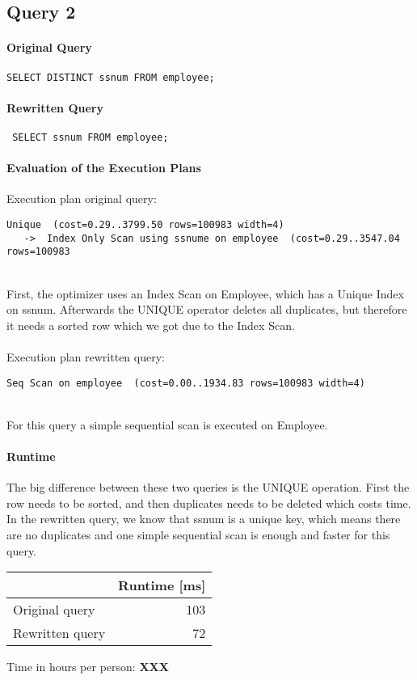 \documentclass[11pt]{scrartcl}
\begin{document}
\newpage
\subsection*{Query 2}

\paragraph{Original Query}

{\small
\begin{verbatim}
SELECT DISTINCT ssnum FROM employee;
\end{verbatim}
}

\paragraph{Rewritten Query}

{\small
\begin{verbatim}
 SELECT ssnum FROM employee;
\end{verbatim}
}

\paragraph{Evaluation of the Execution Plans}

Execution plan original query:

\begin{verbatim}
Unique  (cost=0.29..3799.50 rows=100983 width=4)
   ->  Index Only Scan using ssnume on employee  (cost=0.29..3547.04 rows=100983
\end{verbatim}
\ \\
First, the optimizer uses an Index Scan on Employee, which has a Unique Index on ssnum. Afterwards the UNIQUE operator deletes all duplicates, but therefore it needs a sorted row which we got due to the Index Scan.
\\
\\
Execution plan rewritten query:

\begin{verbatim}
Seq Scan on employee  (cost=0.00..1934.83 rows=100983 width=4)
\end{verbatim}
\ \\
For this query a simple sequential scan is executed on Employee.
\paragraph{Runtime} 
The big difference between these two queries is the UNIQUE operation. First the row needs to be sorted, and then duplicates needs to be deleted which costs time. In the rewritten query, we know that ssnum is a unique key, which means there are no duplicates and one simple sequential scan is enough and faster for this query.


\begin{table}[H]
  \begin{tabular}{l|r}
    & Runtime [ms] \\
   \hline
    Original query & 103 \\
    Rewritten query & 72 \\
  \end{tabular}
\end{table}


  Time in hours per person: {\textbf{XXX}}
\end{document}
